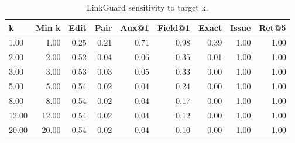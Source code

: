 \begin{table}[t]
\centering
\scriptsize
\setlength{\tabcolsep}{3pt}
\caption{LinkGuard sensitivity to target k.}
\label{tab:linkguard_sensitivity}
\begin{tabular}{lrrrrrrrr}
\toprule
k & Min k & Edit & Pair & Aux@1 & Field@1 & Exact & Issue & Ret@5 \\
\midrule
1.00 & 1.00 & 0.25 & 0.21 & 0.71 & 0.98 & 0.39 & 1.00 & 1.00 \\
2.00 & 2.00 & 0.52 & 0.04 & 0.06 & 0.35 & 0.01 & 1.00 & 1.00 \\
3.00 & 3.00 & 0.53 & 0.03 & 0.05 & 0.33 & 0.00 & 1.00 & 1.00 \\
5.00 & 5.00 & 0.54 & 0.02 & 0.04 & 0.24 & 0.00 & 1.00 & 1.00 \\
8.00 & 8.00 & 0.54 & 0.02 & 0.04 & 0.17 & 0.00 & 1.00 & 1.00 \\
12.00 & 12.00 & 0.54 & 0.02 & 0.04 & 0.12 & 0.00 & 1.00 & 1.00 \\
20.00 & 20.00 & 0.54 & 0.02 & 0.04 & 0.10 & 0.00 & 1.00 & 1.00 \\
\bottomrule
\end{tabular}
\end{table}

